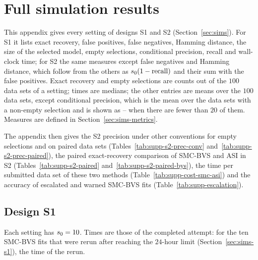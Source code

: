 
\section{Full simulation results}\label{sec:sims-supp}

This appendix gives every setting of designs S1 and S2 (Section~\ref{sec:sims}). For S1 it lists exact recovery, false
positives, false negatives, Hamming distance, the size of the selected model, empty selections, conditional precision,
recall and wall-clock time; for S2 the same measures except false negatives and Hamming distance, which follow from
the others as $s_0(1-\text{recall})$ and their sum with the false positives. Exact recovery and empty selections are
counts out of the $100$ data sets of a setting; times are medians; the other entries are means over the $100$ data
sets, except conditional precision, which is the mean over the data sets with a non-empty selection and is shown as --
when there are fewer than $20$ of them. Measures are defined in Section~\ref{sec:sims-metrics}.

The appendix then gives the S2 precision under other conventions for empty selections and on paired data sets
(Tables~\ref{tab:supp-s2-prec-conv} and~\ref{tab:supp-s2-prec-paired}), the paired exact-recovery comparison of
SMC-BVS and ASI in S2 (Tables~\ref{tab:supp-s2-paired} and~\ref{tab:supp-s2-paired-bys}), the time per submitted data set of these two methods
(Table~\ref{tab:supp-cost-smc-asi}) and the accuracy of escalated and warned SMC-BVS fits
(Table~\ref{tab:supp-escalation}).

\subsection{Design S1}\label{sec:sims-supp-s1}

Each setting has $s_0=10$. Times are those of the completed attempt: for the ten SMC-BVS fits that were rerun after
reaching the $24$-hour limit (Section~\ref{sec:sims-s1}), the time of the rerun.

\begin{table}[htbp]\centering\small
\caption{Design S1: exact recovery, the number of data sets out of $100$ with $\Shat=\Sz$.}\label{tab:supp-s1-exact}

\end{table}


